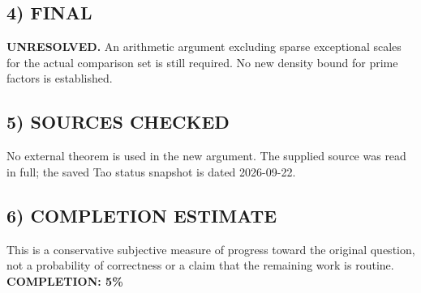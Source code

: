 \subsection{4) FINAL}
\textbf{UNRESOLVED.}
An arithmetic argument excluding sparse exceptional scales for the actual comparison set is still required. No new density bound for prime factors is established.
\subsection{5) SOURCES CHECKED}
No external theorem is used in the new argument. The supplied source was read in full; the saved Tao status snapshot is dated 2026-09-22.
\subsection{6) COMPLETION ESTIMATE}
This is a conservative subjective measure of progress toward the original question, not a probability of correctness or a claim that the remaining work is routine.
\textbf{COMPLETION: 5\%}
